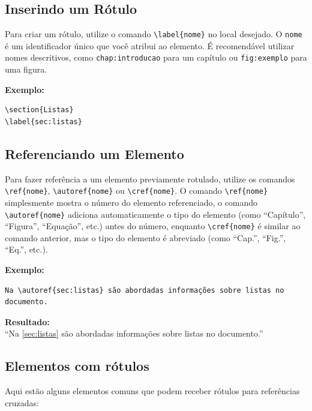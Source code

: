 \subsection{Inserindo um Rótulo}
Para criar um rótulo, utilize o comando \verb|\label{nome}| no local desejado. O \verb|nome| é um identificador único que você atribui ao elemento. É recomendável utilizar nomes descritivos, como \verb|chap:introducao| para um capítulo ou \verb|fig:exemplo| para uma figura. 

\textbf{Exemplo:}
\begin{verbatim}
\section{Listas}
\label{sec:listas}
\end{verbatim}

\subsection{Referenciando um Elemento}
Para fazer referência a um elemento previamente rotulado, utilize os comandos \verb|\ref{nome}|, \verb|\autoref{nome}| ou \verb|\cref{nome}|. O comando \verb|\ref{nome}| simplesmente mostra o número do elemento referenciado, o comando \verb|\autoref{nome}| adiciona automaticamente o tipo do elemento (como ``Capítulo'', ``Figura'', ``Equação'', etc.) antes do número, enquanto \verb|\cref{nome}| é similar ao comando anterior, mas o tipo do elemento é abreviado (como ``Cap.'', ``Fig.'', ``Eq.'', etc.).

\textbf{Exemplo:}
\begin{verbatim}
Na \autoref{sec:listas} são abordadas informações sobre listas no documento.
\end{verbatim}

\textbf{Resultado:} \\
``Na \autoref{sec:listas} são abordadas informações sobre listas no documento.''

\subsection{Elementos com rótulos}
Aqui estão alguns elementos comuns que podem receber rótulos para referências cruzadas:

